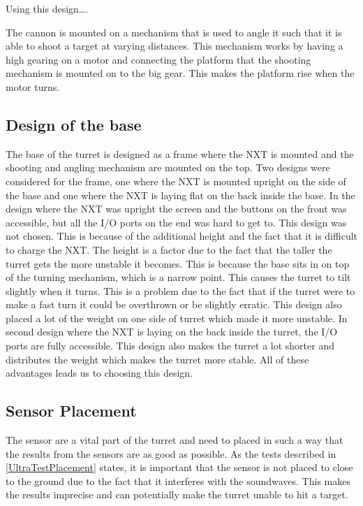 Using this design\ldots {}.\nl

The cannon is mounted on a mechanism that is used to angle it such that it
is able to shoot a target at varying distances. This mechanism works by having a
high gearing on a motor and connecting the platform that the shooting mechanism
is mounted on to the big gear. This makes the platform rise when the motor
turns.

\subsection{Design of the base}
The base of the turret is designed as a frame where the NXT is mounted and
the shooting and angling mechanism are mounted on the top. Two designs were
considered for the frame, one where the NXT is mounted upright on the side of
the base and one where the NXT is laying flat on the back inside the base. In
the design where the NXT was upright the screen and the buttons on the front
was accessible, but all the I/O ports on the end was hard to get to. This
design was not chosen. This is because of the additional height and the fact
that it is difficult to charge the NXT. The height is a factor due to the fact
that the taller the turret gets the more unstable it becomes. This is because
the base sits in on top of the turning mechanism, which is a narrow point. This
causes the turret to tilt slightly when it turns. This is a problem due to the
fact that if the turret were to make a fast turn it could be overthrown or be
slightly erratic. This design also placed a lot of the weight on one side of
turret which made it more unstable.
In second  design where the NXT is laying on the back inside the
turret, the I/O ports are fully accessible. This design also makes the turret a
lot shorter and distributes the weight which makes the turret more stable. All
of these advantages leads us to choosing this design.

\subsection{Sensor Placement}
The sensor are a vital part of the turret and need to placed in such a way that
the results from the sensors are as good as possible. As the tests described in
\autoref{UltraTestPlacement} states, it is important that the sensor is not
placed to close to the ground due to the fact that it interferes with the
soundwaves. This makes the results imprecise and can potentially make the
turret unable to hit a target.\nl

